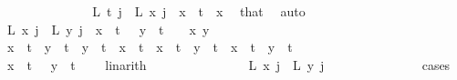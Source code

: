 \begin{isabellebody}
\ \ \ \ \ \ \ \ \ \ \isamarkupfalse%
\ \isamarkupfalse%
\ {\isacharasterisk}{\kern0pt}{\isacharasterisk}{\kern0pt}{\isacharcolon}{\kern0pt}\ {\isachardoublequoteopen}L{\isacharprime}{\kern0pt}\ t\ j\ {\isacharequal}{\kern0pt}\ L{\isacharprime}{\kern0pt}\ x\ j{\isachardoublequoteclose}\ \ {\isachardoublequoteopen}x\ {\isacharless}{\kern0pt}\ t{\isachardoublequoteclose}\ \ x\ \isamarkupfalse%
\ that\ \isamarkupfalse%
\ auto\isanewline
\ \ \ \ \ \ \ \ \ \ \isamarkupfalse%
\ {\isachardoublequoteopen}L{\isacharprime}{\kern0pt}\ x\ j\ {\isacharequal}{\kern0pt}\ L{\isacharprime}{\kern0pt}\ y\ j{\isachardoublequoteclose}\ \ {\isachardoublequoteopen}x\ {\isacharless}{\kern0pt}\ t\ {\isacharplus}{\kern0pt}\ {}{\isachardoublequoteclose}\ {\isachardoublequoteopen}y\ {\isacharless}{\kern0pt}\ t\ {\isacharplus}{\kern0pt}\ {}{\isachardoublequoteclose}\ \ x\ y\ \isanewline
\ \ \ \ \ \ \ \ \ \ \isamarkupfalse%
{\isacharminus}{\kern0pt}\isanewline
\ \ \ \ \ \ \ \ \ \ \ \ \isamarkupfalse%
\ {\isachardoublequoteopen}x\ {\isacharless}{\kern0pt}\ t\ {\isasymand}\ y\ {\isacharequal}{\kern0pt}\ t{\isachardoublequoteclose}\ {\isacharbar}{\kern0pt}\ {\isachardoublequoteopen}y\ {\isacharless}{\kern0pt}\ t\ {\isasymand}\ x\ {\isacharequal}{\kern0pt}\ t{\isachardoublequoteclose}\ {\isacharbar}{\kern0pt}\ {\isachardoublequoteopen}x\ {\isacharequal}{\kern0pt}\ t\ {\isasymand}\ y\ {\isacharequal}{\kern0pt}\ t{\isachardoublequoteclose}\ {\isacharbar}{\kern0pt}\ {\isachardoublequoteopen}x\ {\isacharless}{\kern0pt}\ t\ {\isasymand}\ y\ {\isacharless}{\kern0pt}\ t{\isachardoublequoteclose}\ \isanewline
\ \ \ \ \ \ \ \ \ \ \ \ \ \ \isamarkupfalse%
\ {\isacartoucheopen}x\ {\isacharless}{\kern0pt}\ t\ {\isacharplus}{\kern0pt}\ {}{\isacartoucheclose}\ {\isacartoucheopen}y\ {\isacharless}{\kern0pt}\ t\ {\isacharplus}{\kern0pt}\ {}{\isacartoucheclose}\ \isamarkupfalse%
\ linarith\isanewline
\ \ \ \ \ \ \ \ \ \ \ \ \isamarkupfalse%
\ \isamarkupfalse%
\ {\isachardoublequoteopen}L{\isacharprime}{\kern0pt}\ x\ j\ {\isacharequal}{\kern0pt}\ L{\isacharprime}{\kern0pt}\ y\ j{\isachardoublequoteclose}\ \isanewline
\ \ \ \ \ \ \ \ \ \ \ \ \isamarkupfalse%
\ cases\isanewline
\ \ \ \ \ \ \ \ \ \ \ \ \ \ \isamarkupfalse%
\ {}\isanewline
\ \ \ \ \ \ \ \ \ \ \ \ \ \ \isamarkupfalse%

\end{isabellebody}
